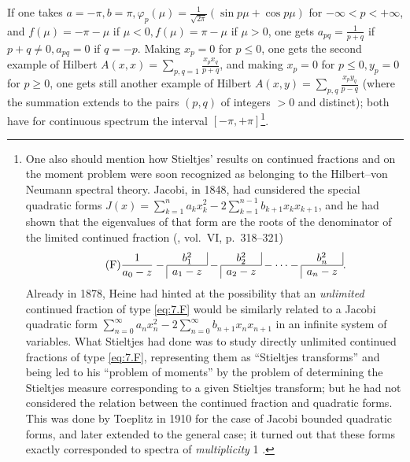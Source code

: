 \documentclass[12pt,a4paper,leqno,twoside]{extbook}
\makeatletter
\newcommand{\pfrac}[2]{%
    \begin{array}{@{} c @{}}%
        \multicolumn{1}{c|}{#1} \\%
        \hline%
        \multicolumn{1}{|c}{#2}%
    \end{array}%
}
\makeatother
\begin{document}
If one takes \(a = -\pi, b = \pi, \varphi_p(\mu) = \frac{1}{\sqrt{2\pi}} (\sin{p\mu} + \cos{p\mu})\) for \(-\infty < p < +\infty\), and \(f(\mu) = -\pi - \mu\) if \(\mu < 0, f(\mu) = \pi - \mu\) if \(\mu > 0\), one gets \(a_{pq} = \frac{1}{p+q}\) if \(p + q \neq 0, a_{pq} = 0\) if \(q = -p\). Making \(x_p = 0\) for \(p \leq 0\), one gets the second example of Hilbert \(A(x,x) = \sum_{p,q=1} \frac{x_p x_q}{p+q}\), and making \(x_p = 0\) for \(p \leq 0, y_p = 0\) for \(p \geq 0\), one gets still another example of Hilbert \(A(x,y) = \sum_{p,q} \frac{x_p y_q}{p-q}\) (where the summation extends to the pairs \((p,q)\) of integers \(>0\) and distinct); both have for continuous spectrum the interval \([-\pi, +\pi]\)\footnote{One also should mention how Stieltjes' results on continued fractions and on the moment problem were soon recognized as belonging to the Hilbert--von Neumann spectral theory. Jacobi, in 1848, had cunsidered the special quadratic forms \(J(x) = \sum\limits_{k=1}^n a_k x_k^2 - 2 \sum\limits_{k=1}^{n-1} b_{k+1} x_k x_{k+1}\), and he had shown that the eigenvalues of that form are the roots of the denominator of the limited continued fraction (\cite{120}, vol.~VI, p.~318--321)
\begin{equation}
    \tag{F}
    \label{eq:7.F}
    \frac{1}{a_0 - z} - \pfrac{b_1^2}{a_1 - z} -  \pfrac{b_2^2}{a_2 - z} - \cdots - \pfrac{b_n^2}{a_n - z}.
\end{equation}
Already in 1878, Heine \cite[vol.~1, p.~421]{104} had hinted at the possibility that an \emph{unlimited} continued fraction of type \eqref{eq:7.F} would be similarly related to a Jacobi quadratic form \(\sum\limits_{n=0}^\infty a_n x_n^2 - 2 \sum\limits_{n=0}^\infty b_{n+1} x_n x_{n+1}\) in an infinite system of variables. What Stieltjes had done was to study directly unlimited continued fractions of type \eqref{eq:7.F}, representing them as ``Stieltjes transforms'' and being led to his ``problem of moments'' by the problem of determining the Stieltjes measure corresponding to a given Stieltjes transform; but he had not considered the relation between the continued fraction and quadratic forms. This was done by Toeplitz in 1910 \cite{214} for the case of Jacobi bounded quadratic forms, and later extended to the general case; it turned out that these forms exactly corresponded to spectra of \emph{multiplicity} 1 \cite{207}.}.
\end{document}
